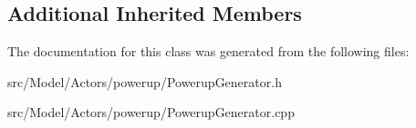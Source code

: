 \subsection*{Additional Inherited Members}


The documentation for this class was generated from the following files\+:\begin{DoxyCompactItemize}
\item 
src/\+Model/\+Actors/powerup/Powerup\+Generator.\+h\item 
src/\+Model/\+Actors/powerup/Powerup\+Generator.\+cpp\end{DoxyCompactItemize}
